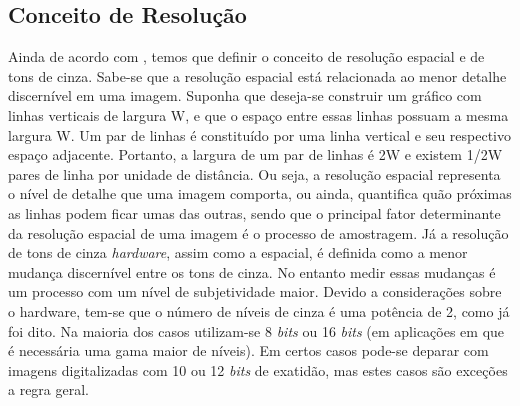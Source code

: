 \subsection{Conceito de Resolução} \label{resolucao}


Ainda de acordo com , temos que definir o conceito de resolução espacial e de tons de cinza. Sabe-se que a resolução espacial está relacionada ao menor detalhe discernível em uma imagem. Suponha que deseja-se construir um gráfico com linhas verticais de largura W, e que o espaço entre essas linhas possuam a mesma largura W. Um par de linhas é constituído por uma linha vertical e seu respectivo espaço adjacente. Portanto, a largura de um par de linhas é 2W e existem 1/2W pares de linha por unidade de distância. Ou seja, a resolução espacial representa o nível de detalhe que uma imagem comporta, ou ainda, quantifica quão próximas as linhas podem ficar umas das outras, sendo que o principal fator determinante da resolução espacial de uma imagem é o processo de amostragem. Já a resolução de tons de cinza \textit{hardware}, assim como a espacial, é definida como a menor mudança discernível entre os tons de cinza. No entanto medir essas mudanças é um processo com um nível de subjetividade maior. Devido a considerações sobre o hardware, tem-se que o número de níveis de cinza é uma potência de 2, como já foi dito. Na maioria dos casos utilizam-se 8 \textit{bits} ou 16 \textit{bits} (em aplicações em que é necessária uma gama maior de níveis). Em certos casos pode-se deparar com imagens digitalizadas com 10 ou 12 \textit{bits} de exatidão, mas estes casos são exceções a regra geral.


